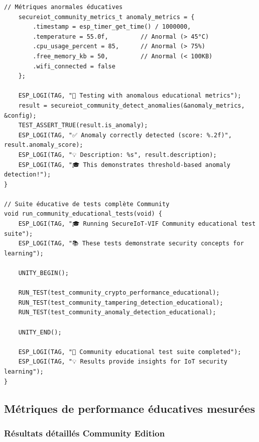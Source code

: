 \begin{lstlisting}[caption={Framework de test éducatif Community}]
    // Métriques anormales éducatives
    secureiot_community_metrics_t anomaly_metrics = {
        .timestamp = esp_timer_get_time() / 1000000,
        .temperature = 55.0f,         // Anormal (> 45°C)
        .cpu_usage_percent = 85,      // Anormal (> 75%)
        .free_memory_kb = 50,         // Anormal (< 100KB)
        .wifi_connected = false
    };
    
    ESP_LOGI(TAG, "🚨 Testing with anomalous educational metrics");
    result = secureiot_community_detect_anomalies(&anomaly_metrics, &config);
    TEST_ASSERT_TRUE(result.is_anomaly);
    ESP_LOGI(TAG, "✅ Anomaly correctly detected (score: %.2f)", result.anomaly_score);
    ESP_LOGI(TAG, "💡 Description: %s", result.description);
    ESP_LOGI(TAG, "🎓 This demonstrates threshold-based anomaly detection!");
}

// Suite éducative de tests complète Community
void run_community_educational_tests(void) {
    ESP_LOGI(TAG, "🎓 Running SecureIoT-VIF Community educational test suite");
    ESP_LOGI(TAG, "📚 These tests demonstrate security concepts for learning");
    
    UNITY_BEGIN();
    
    RUN_TEST(test_community_crypto_performance_educational);
    RUN_TEST(test_community_tampering_detection_educational);
    RUN_TEST(test_community_anomaly_detection_educational);
    
    UNITY_END();
    
    ESP_LOGI(TAG, "🎉 Community educational test suite completed");
    ESP_LOGI(TAG, "💡 Results provide insights for IoT security learning");
}
\end{lstlisting}

\subsection{Métriques de performance éducatives mesurées}

\subsubsection{Résultats détaillés Community Edition}

